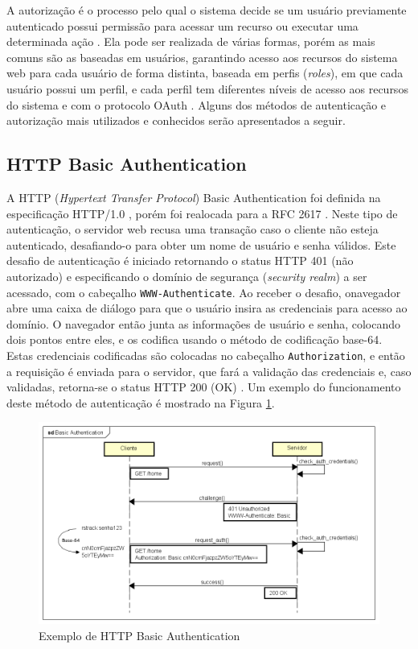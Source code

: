 \documentclass[12pt]{article}
\begin{document}
A autorização é o processo pelo qual o sistema decide se um usuário previamente autenticado
possui permissão para acessar um recurso ou executar uma determinada ação \cite{SPILCA2020}. Ela pode ser realizada de várias formas, porém as mais comuns são as baseadas em usuários, garantindo acesso aos recursos do sistema web para cada usuário de forma distinta, baseada em perfis (\emph{roles}), em que cada usuário possui um perfil, e cada perfil tem diferentes níveis de acesso aos recursos do sistema e com o protocolo OAuth \cite{CHAPMAN2012}. Alguns dos métodos de autenticação e autorização mais utilizados e conhecidos serão apresentados a seguir.


\subsection{HTTP Basic Authentication}

A HTTP (\emph{Hypertext Transfer Protocol}) Basic Authentication foi definida na especificação
HTTP/1.0 \cite{RFC1945}, porém foi realocada para a RFC 2617 \cite{RFC2617}. Neste tipo de
autenticação, o servidor web recusa uma transação caso o cliente não esteja autenticado,
desafiando-o para obter um nome de usuário e senha válidos. Este desafio de autenticação é iniciado
retornando o status HTTP 401 (não autorizado) e especificando o domínio de segurança
(\emph{security realm}) a ser acessado, com o cabeçalho \texttt{WWW-Authenticate}. Ao receber o 
desafio, onavegador abre uma caixa de diálogo para que o usuário insira as credenciais para acesso 
ao domínio. O navegador então junta as informações de usuário e senha, colocando dois pontos entre 
eles, e os codifica usando o método de codificação base-64. Estas credenciais codificadas são 
colocadas no cabeçalho \texttt{Authorization}, e então a requisição é enviada para o servidor, que 
fará a validação das credenciais e, caso validadas, retorna-se o status HTTP 200 (OK) \cite{GOURLEY2002}. Um exemplo do funcionamento deste método de autenticação é mostrado na Figura \ref{fig:basicAuth}.

\begin{figure}[ht]
  \centering
  \includegraphics[width=1\textwidth]{Basic Authentication.png}
  \caption{Exemplo de HTTP Basic Authentication}
  \label{fig:basicAuth}
\end{figure}
\end{document}
